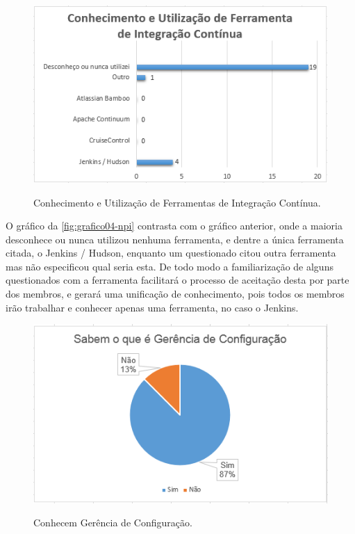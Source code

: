 \begin{figure}[H]
\centering
\caption[Conhecimento e Utilização de Ferramentas de Integração Contínua]{Conhecimento e Utilização de Ferramentas de Integração Contínua.}\includegraphics[scale=0.9]{./images/grafico-ci04}
\label{fig:grafico04-npi}
\end{figure}
O gráfico da \autoref{fig:grafico04-npi} contrasta com o gráfico anterior, onde a maioria desconhece ou nunca utilizou nenhuma ferramenta, e dentre a única ferramenta citada, o Jenkins / Hudson, enquanto um questionado citou outra ferramenta mas não especificou qual seria esta. De todo modo a familiarização de alguns questionados com a ferramenta facilitará o processo de aceitação desta por parte dos membros, e gerará uma unificação de conhecimento, pois todos os membros irão trabalhar e conhecer apenas uma ferramenta, no caso o Jenkins.

 

\begin{figure}[H]
\centering 
\caption[Conhecem Gerência de Configuração]{Conhecem Gerência de Configuração.}\includegraphics[scale=0.9]{./images/grafico-ci05}
\label{fig:grafico05-npi}
\end{figure}



